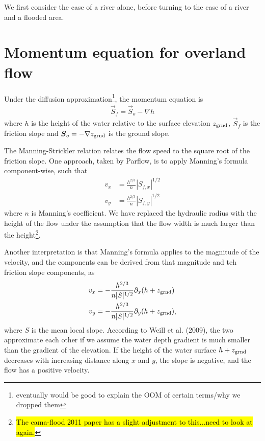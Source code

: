 \documentclass[twoside,10pt]{report}
\begin{document}
We first consider the case of a river alone, before turning to the case of a river and a flooded area. 

\section{Momentum equation for overland flow}
Under the diffusion approximation\footnote{eventually would be good to explain the OOM of certain terms/why we dropped them}, the momentum equation is
\begin{align}
    \vec{S}_f  = \vec{S}_o-\nabla h
\end{align}
where $h$ is the height of the water relative to the surface elevation $z_{\rm grnd}$, $\vec{S}_f$ is the friction slope and $\vec{S}_o = -\nabla z_{\rm grnd}$ is the ground slope. 

The Manning-Strickler relation relates the flow speed to the square root of the friction slope. One approach, taken by Parflow, is to apply Manning's formula component-wise, such that 
\begin{align}\label{vel1}
    v_x & = \frac{h^{2/3}}{n} |S_{f,x}|^{1/2} \nonumber \\
    v_y & =\frac{h^{2/3}}{n} |S_{f,y}|^{1/2}
\end{align}
where $n$ is Manning's coefficient. We have replaced the hydraulic radius with the height of the flow under the assumption that the flow width is much larger than the height\footnote{\hl{The cama-flood 2011 paper has a slight adjustment to this...need to look at again.}}. 

Another interpretation is that Manning's formula applies to the magnitude of the velocity, and the components can be derived from that magnitude and teh friction slope components, as
\begin{align}\label{vel}
    v_x & = -\frac{h^{2/3}}{n|S|^{1/2}} \partial_x (h+z_{\rm grnd}) \nonumber \\
    v_y & =-\frac{h^{2/3}}{n|S|^{1/2}} \partial_y (h+z_{\rm grnd}),
\end{align}
where $S$ is the mean local slope.  According to Weill et al. (2009), the two approximate each other if we assume the water depth gradient is much smaller than the gradient of the elevation.  If the height of the water surface $h+z_{\rm grnd}$ decreases with increasing distance along $x$ and $y$, the slope is negative, and the flow has a positive velocity.
\end{document}
